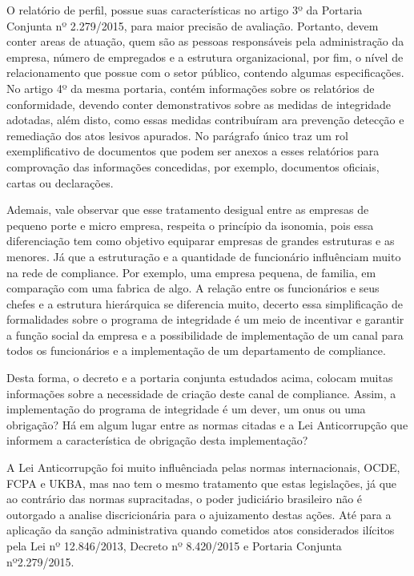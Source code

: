 O relatório de perfil, possue suas características no artigo 3º da Portaria Conjunta nº 2.279/2015, para maior precisão de avaliação. Portanto, devem conter areas de atuação, quem são as pessoas responsáveis pela administração da empresa, número de empregados e a estrutura organizacional, por fim, o nível de relacionamento que possue com o setor público, contendo algumas especificações. No artigo 4º da mesma portaria, contém informações sobre os relatórios de conformidade, devendo conter demonstrativos sobre as medidas de integridade adotadas, além disto, como essas medidas contribuíram ara prevenção detecção e remediação dos atos lesivos apurados. No parágrafo único traz um rol exemplificativo de documentos que podem ser anexos a esses relatórios para comprovação das informações concedidas, por exemplo, documentos oficiais, cartas ou declarações. 

Ademais, vale observar que esse tratamento desigual entre as empresas de pequeno porte e micro empresa, respeita o princípio da isonomia, pois essa diferenciação tem como objetivo equiparar empresas de grandes estruturas e as menores. Já que a estruturação e a quantidade de funcionário influênciam muito na rede de compliance. Por exemplo, uma empresa pequena, de familia, em comparação com uma fabrica de algo. A relação entre os funcionários e seus chefes e a estrutura hierárquica se diferencia muito, decerto essa simplificação de formalidades sobre o programa de integridade é um meio de incentivar e garantir a função social da empresa e a possibilidade de implementação de um canal para todos os funcionários e a implementação de um departamento de compliance.

Desta forma, o decreto e a portaria conjunta estudados acima, colocam muitas informações sobre a necessidade de criação deste canal de compliance. Assim, a implementação do programa de integridade é um dever, um onus ou uma obrigação? Há em algum lugar entre as normas citadas e a Lei Anticorrupção que informem a característica de obrigação desta implementação?

A Lei Anticorrupção foi muito influênciada pelas normas internacionais, OCDE, FCPA e UKBA, mas nao tem o mesmo tratamento que estas legislações, já que ao contrário das normas supracitadas, o poder judiciário brasileiro não é outorgado a analise discricionária para o ajuizamento destas ações. Até para a aplicação da sanção administrativa quando cometidos atos considerados ilícitos pela Lei nº 12.846/2013, Decreto nº 8.420/2015 e Portaria Conjunta nº2.279/2015. 

